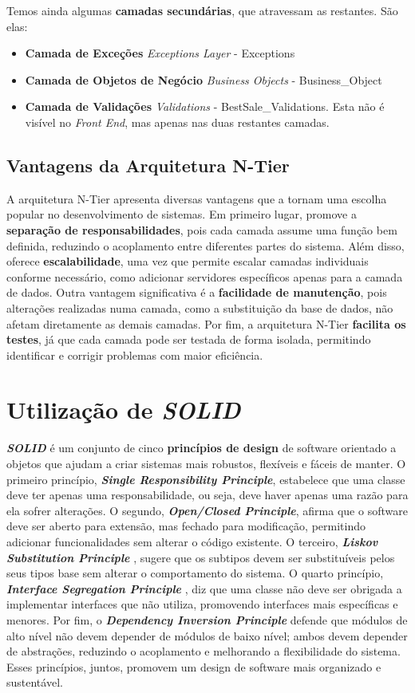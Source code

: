 \documentclass[11pt]{scrartcl} %
\begin{document}
Temos ainda algumas \textbf{camadas secundárias}, que atravessam as restantes. São elas:
\begin{itemize}
	\item \textbf{Camada de Exceções} \textit{Exceptions Layer} - Exceptions
	\item \textbf{Camada de Objetos de Negócio} \textit{Business Objects} - Business\_Object
	\item \textbf{Camada de Validações} \textit{Validations} - BestSale\_Validations. Esta não é visível no \textit{Front End}, mas apenas nas duas restantes camadas.
\end{itemize}

\subsection{Vantagens da Arquitetura N-Tier}
A arquitetura N-Tier apresenta diversas vantagens que a tornam uma escolha popular no desenvolvimento de sistemas. Em primeiro lugar, promove a \textbf{separação de responsabilidades}, pois cada camada assume uma função bem definida, reduzindo o acoplamento entre diferentes partes do sistema. Além disso, oferece \textbf{escalabilidade}, uma vez que permite escalar camadas individuais conforme necessário, como adicionar servidores específicos apenas para a camada de dados. Outra vantagem significativa é a \textbf{facilidade de manutenção}, pois alterações realizadas numa camada, como a substituição da base de dados, não afetam diretamente as demais camadas. Por fim, a arquitetura N-Tier \textbf{facilita os testes}, já que cada camada pode ser testada de forma isolada, permitindo identificar e corrigir problemas com maior eficiência.

\newpage
\section{Utilização de \textbf{\textit{SOLID}}}
\textbf{\textit{SOLID}} é um conjunto de cinco \textbf{princípios de design} de software orientado a objetos que ajudam a criar sistemas mais robustos, flexíveis e fáceis de manter. O primeiro princípio, \textbf{\textit{Single Responsibility Principle}}, estabelece que uma classe deve ter apenas uma responsabilidade, ou seja, deve haver apenas uma razão para ela sofrer alterações. O segundo, \textbf{\textit{Open/Closed Principle}}, afirma que o software deve ser aberto para extensão, mas fechado para modificação, permitindo adicionar funcionalidades sem alterar o código existente. O terceiro, \textbf{\textit{Liskov Substitution Principle}} , sugere que os subtipos devem ser substituíveis pelos seus tipos base sem alterar o comportamento do sistema. O quarto princípio, \textbf{\textit{Interface Segregation Principle}} , diz que uma classe não deve ser obrigada a implementar interfaces que não utiliza, promovendo interfaces mais específicas e menores. Por fim, o \textbf{\textit{Dependency Inversion Principle}} defende que módulos de alto nível não devem depender de módulos de baixo nível; ambos devem depender de abstrações, reduzindo o acoplamento e melhorando a flexibilidade do sistema. Esses princípios, juntos, promovem um design de software mais organizado e sustentável.
	
\end{document}
